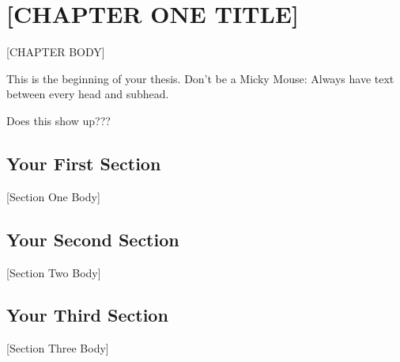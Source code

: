 \chapter{[CHAPTER ONE TITLE]}
[CHAPTER BODY]

This is the beginning of your thesis. Don't be a Micky
Mouse\cite{mm2}: Always have text between every head and subhead.

Does this show up???

\section{Your First Section}
[Section One Body]
\section{Your Second Section}
[Section Two Body]
\section{Your Third Section}
[Section Three Body]